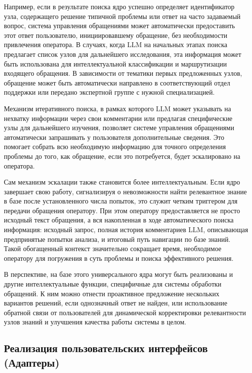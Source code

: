 Например, если в результате поиска ядро успешно определяет идентификатор узла, содержащего решение типичной проблемы или ответ на часто задаваемый вопрос, система управления обращениями может автоматически предоставить этот ответ пользователю, инициировавшему обращение, без необходимости привлечения оператора. В случаях, когда LLM на начальных этапах поиска предлагает список узлов для дальнейшего исследования, эта информация может быть использована для интеллектуальной классификации и маршрутизации входящего обращения. В зависимости от тематики первых предложенных узлов, обращение может быть автоматически направлено в соответствующий отдел поддержки или передано экспертной группе с нужной специализацией.

Механизм итеративного поиска, в рамках которого LLM может указывать на нехватку информации через свои комментарии или предлагая специфические узлы для дальнейшего изучения, позволяет системе управления обращениями автоматически запрашивать у пользователя дополнительные сведения. Это помогает собрать всю необходимую информацию для точного определения проблемы до того, как обращение, если это потребуется, будет эскалировано на оператора.

Сам механизм эскалации также становится более интеллектуальным. Если ядро завершает свою работу, сигнализируя о невозможности найти релевантное знание в базе после установленного числа попыток, это служит четким триггером для передачи обращения оператору. При этом оператору предоставляется не просто исходный текст обращения, а вся накопленная в ходе автоматического поиска информация: исходный запрос, полная история комментариев LLM, описывающая предпринятые попытки анализа, и итоговый путь навигации по базе знаний. Такой обогащенный контекст значительно сокращает время, необходимое оператору для погружения в суть проблемы и поиска эффективного решения.

В перспективе, на базе этого универсального ядра могут быть реализованы и другие интеллектуальные функции, специфичные для системы обработки обращений. К ним можно отнести проактивное предложение нескольких вариантов решений, если однозначный ответ не найден, или использование обратной связи от пользователей для динамической корректировки релевантности узлов знаний и улучшения качества работы системы в целом.

\subsection{Реализация пользовательских интерфейсов (Адаптеры)}

